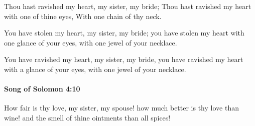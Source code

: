 			\begin{versebox}
					\item[BHS] 
					\item[LXX] 
					\item[ASV] Thou hast ravished my heart, my sister, my bride; Thou hast ravished my heart with one of thine eyes, With one chain of thy neck.
					\item[NIV] You have stolen my heart, my sister, my bride; you have stolen my heart with one glance of your eyes, with one jewel of your necklace.
					\item[NRSV] You have ravished my heart, my sister, my bride, you have ravished my heart with a glance of your eyes, with one jewel of your necklace.
			\end{versebox}

		\paragraph{Song of Solomon 4:10} %
			\label{SONGOFSOLOMON-4-10}

			How fair is thy love, my sister, my spouse! how much better is thy love than wine! and the smell of thine ointments than all spices!

